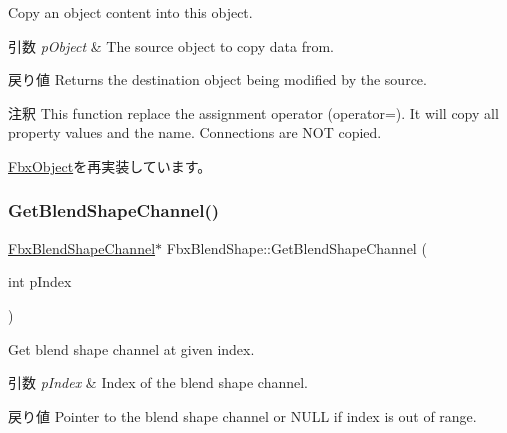 Copy an object content into this object. 
\begin{DoxyParams}{引数}
{\em p\+Object} & The source object to copy data from. \\
\hline
\end{DoxyParams}
\begin{DoxyReturn}{戻り値}
Returns the destination object being modified by the source. 
\end{DoxyReturn}
\begin{DoxyRemark}{注釈}
This function replace the assignment operator (operator=). It will copy all property values and the name. Connections are N\+OT copied. 
\end{DoxyRemark}


\hyperlink{class_fbx_object_a0c0c5adb38284d14bb82c04d54504a3e}{Fbx\+Object}を再実装しています。

\mbox{\label{class_fbx_blend_shape_aac445f8468f3135f5c810ef51a089ff2}} 
\subsubsection{\texorpdfstring{Get\+Blend\+Shape\+Channel()}{GetBlendShapeChannel()}\hspace{0.1cm}{\footnotesize\ttfamily [1/2]}}
{\footnotesize\ttfamily \hyperlink{class_fbx_blend_shape_channel}{Fbx\+Blend\+Shape\+Channel}$\ast$ Fbx\+Blend\+Shape\+::\+Get\+Blend\+Shape\+Channel (\begin{DoxyParamCaption}\item[{int}]{p\+Index }\end{DoxyParamCaption})}

Get blend shape channel at given index. 
\begin{DoxyParams}{引数}
{\em p\+Index} & Index of the blend shape channel. \\
\hline
\end{DoxyParams}
\begin{DoxyReturn}{戻り値}
Pointer to the blend shape channel or {\ttfamily N\+U\+LL} if index is out of range. 
\end{DoxyReturn}
\mbox{\label{class_fbx_blend_shape_a2f945fdf198655b0434e5bde7d897a8a}} 
